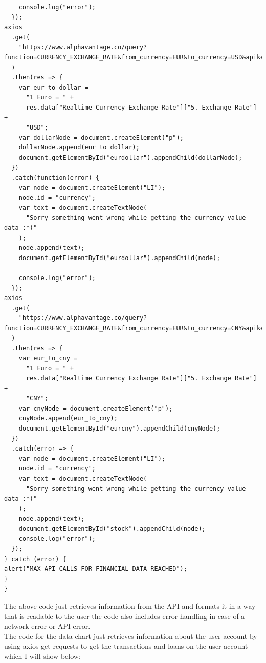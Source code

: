 \begin{verbatim}
    console.log("error");
  });
axios
  .get(
    "https://www.alphavantage.co/query?function=CURRENCY_EXCHANGE_RATE&from_currency=EUR&to_currency=USD&apikey=G38RVCM1OWLSKALP"
  )
  .then(res => {
    var eur_to_dollar =
      "1 Euro = " +
      res.data["Realtime Currency Exchange Rate"]["5. Exchange Rate"] +
      "USD";
    var dollarNode = document.createElement("p");
    dollarNode.append(eur_to_dollar);
    document.getElementById("eurdollar").appendChild(dollarNode);
  })
  .catch(function(error) {
    var node = document.createElement("LI");
    node.id = "currency";
    var text = document.createTextNode(
      "Sorry something went wrong while getting the currency value data :*("
    );
    node.append(text);
    document.getElementById("eurdollar").appendChild(node);

    console.log("error");
  });
axios
  .get(
    "https://www.alphavantage.co/query?function=CURRENCY_EXCHANGE_RATE&from_currency=EUR&to_currency=CNY&apikey=G38RVCM1OWLSKALP"
  )
  .then(res => {
    var eur_to_cny =
      "1 Euro = " +
      res.data["Realtime Currency Exchange Rate"]["5. Exchange Rate"] +
      "CNY";
    var cnyNode = document.createElement("p");
    cnyNode.append(eur_to_cny);
    document.getElementById("eurcny").appendChild(cnyNode);
  })
  .catch(error => {
    var node = document.createElement("LI");
    node.id = "currency";
    var text = document.createTextNode(
      "Sorry something went wrong while getting the currency value data :*("
    );
    node.append(text);
    document.getElementById("stock").appendChild(node);
    console.log("error");
  });
} catch (error) {
alert("MAX API CALLS FOR FINANCIAL DATA REACHED");
}
}
\end{verbatim}
The above code just retrieves information from the API and formats it in a way that is readable to the user
the code also includes error handling in case of a network error or API error.
\\
The code for the data chart just retrieves information about the user account by using axios get requests to get the
transactions and loans on the user account which I will show below:

